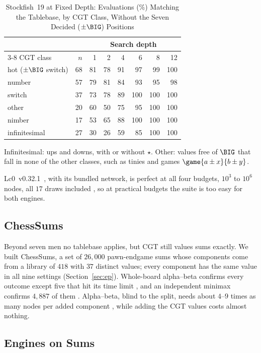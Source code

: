 \begin{table}[!t]
\centering
\caption{Stockfish~19 at Fixed Depth: Evaluations (\%) Matching the Tablebase, by CGT Class, Without the
Seven Decided ($\pm\BIG$) Positions}
\label{tab:sf}
\footnotesize
\begin{tabular}{@{}lrrrrrrr@{}}
\toprule
 & & \multicolumn{6}{c}{Search depth} \\
\cmidrule(l){3-8}
CGT class & $n$ & 1 & 2 & 4 & 6 & 8 & 12 \\
\midrule
hot ($\pm\BIG$ switch) & 68 & 81 & 78 & 91 & 97 & 99 & 100 \\
number & 57 & 79 & 81 & 84 & 93 & 95 & 98 \\
switch & 37 & 73 & 78 & 89 & 100 & 100 & 100 \\
other & 20 & 60 & 50 & 75 & 95 & 100 & 100 \\
nimber & 17 & 53 & 65 & 88 & 100 & 100 & 100 \\
infinitesimal & 27 & 30 & 26 & 59 & 85 & 100 & 100 \\
\bottomrule
\end{tabular}

\smallskip
\parbox{\columnwidth}{\footnotesize Infinitesimal: ups and downs, with or without $\star$. Other: values free of
$\BIG$ that fall in none of the other classes, such as tinies and games $\game{a\pm x}{b\pm y}$.}
\end{table}

Lc0~v0.32.1~\cite{Lc0}, with its bundled network, is perfect at all four budgets, $10^3$ to $10^6$ nodes,
all $17$ draws included , so at practical budgets the suite is too easy for both engines.

\subsection{ChessSums}

Beyond seven men no tablebase applies, but CGT still values sums exactly. We built ChessSums, a set of
$26{,}000$ pawn-endgame sums whose components come from a library of $418$ with $37$ distinct values; every
component has the same value in all nine settings (Section~\ref{sec:ep}). Whole-board alpha--beta confirms every outcome
except five that hit its time limit , and an independent minimax confirms $4{,}887$ of them
. Alpha--beta, blind to the split,
needs about $4$--$9$ times as many nodes per added component , while adding the CGT values costs
almost nothing.

\subsection{Engines on Sums}

